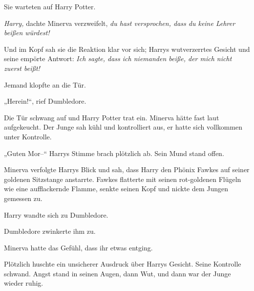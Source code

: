Sie warteten auf Harry Potter. 

\emph{Harry,} dachte Minerva verzweifelt, \emph{du hast versprochen, dass du keine Lehrer beißen würdest!} 

Und im Kopf sah sie die Reaktion klar vor sich; Harrys wutverzerrtes Gesicht und seine empörte Antwort: \emph{Ich sagte, dass ich niemanden beiße, der mich nicht zuerst beißt!} 

Jemand klopfte an die Tür. 

„Herein!“, rief Dumbledore. 

Die Tür schwang auf und Harry Potter trat ein. Minerva hätte fast laut aufgekeucht. Der Junge sah kühl und kontrolliert aus, er hatte sich vollkommen unter Kontrolle. 

„Guten Mor–“ Harrys Stimme brach plötzlich ab. Sein Mund stand offen. 

Minerva verfolgte Harrys Blick und sah, dass Harry den Phönix Fawkes auf seiner goldenen Sitzstange anstarrte. Fawkes flatterte mit seinen rot-goldenen Flügeln wie eine aufflackernde Flamme, senkte seinen Kopf und nickte dem Jungen gemessen zu. 

Harry wandte sich zu Dumbledore. 

Dumbledore zwinkerte ihm zu. 

Minerva hatte das Gefühl, dass ihr etwas entging. 

Plötzlich huschte ein unsicherer Ausdruck über Harrys Gesicht. Seine Kontrolle schwand. Angst stand in seinen Augen, dann Wut, und dann war der Junge wieder ruhig. 

